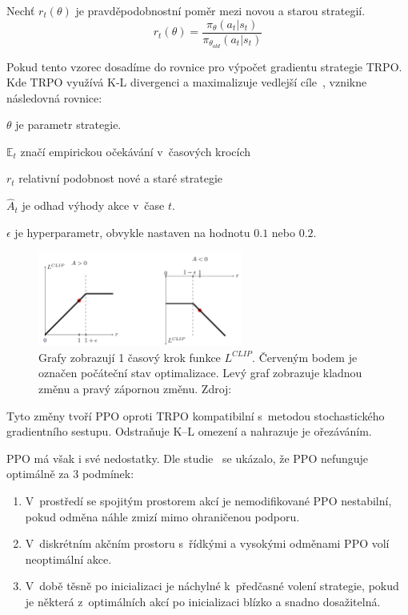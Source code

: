 Nechť $r_t(\theta)$ je pravděpodobnostní poměr mezi novou a starou strategií.
\begin{equation}
  r_t(\theta) = \frac{\pi_\theta(a_t \vert s_t)}{\pi_{\theta_{old}}(a_t \vert s_t)}
\end{equation}

Pokud tento vzorec dosadíme do rovnice pro výpočet gradientu strategie TRPO.
Kde TRPO využívá K-L divergenci a maximalizuje vedlejší cíle~\cite{policy_gradients}, vznikne následovná rovnice:



\begin{myitemize}
  \item $\theta$ je parametr strategie.
  \item $\mathbb{E}_t$ značí empirickou očekávání v~časových krocích
  \item $r_t$ relativní podobnost nové a staré strategie~\cite{PPO_paper}
  \item $\hat{A}_t$ je odhad výhody akce v~čase $t$.
  \item $\epsilon$ je hyperparametr, obvykle nastaven na hodnotu $0.1$ nebo $0.2$.
\end{myitemize}

\begin{figure}[H]
	\centering
	\includegraphics[width=0.6\textwidth]{obrazky-figures/clip}
	\caption{Grafy zobrazují 1 časový krok funkce $L^{CLIP}$.
  Červeným bodem je označen počáteční stav optimalizace.
  Levý graf zobrazuje kladnou změnu a pravý zápornou změnu.
  Zdroj:~\cite{RL_basics}}\label{fig:clip}
\end{figure}

Tyto změny tvoří PPO oproti TRPO kompatibilní s~metodou stochastického gradientního sestupu.
Odstraňuje K--L omezení a nahrazuje je ořezáváním.

PPO má však i své nedostatky.
\label{PPO_weakness}
Dle studie~\cite{PPO_weakness} se ukázalo, že PPO nefunguje optimálně za 3 podmínek:
\begin{enumerate}
  \item V~prostředí se spojitým prostorem akcí je nemodifikované PPO nestabilní, pokud odměna náhle zmizí mimo ohraničenou podporu.
  \item V~diskrétním akčním prostoru s~řídkými a vysokými odměnami PPO volí neoptimální akce.
  \item V~době těsně po inicializaci je náchylné k~předčasné volení strategie, pokud je některá z~optimálních akcí po inicializaci blízko a snadno dosažitelná.
\end{enumerate}

